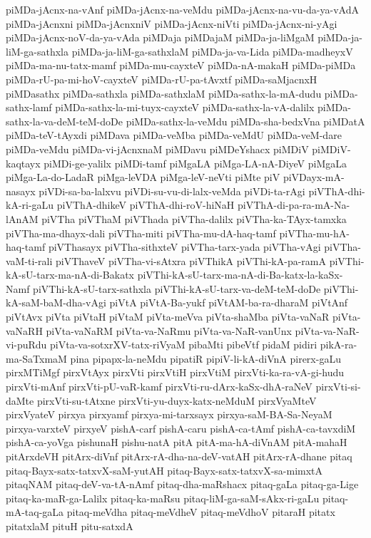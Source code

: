 {piMDa-jAcnx-na-vAnf
piMDa-jAcnx-na-veMdu
piMDa-jAcnx-na-vu-da-ya-vAdA
piMDa-jAcnxni
piMDa-jAcnxniV
piMDa-jAcnx-niVti
piMDa-jAcnx-ni-yAgi
piMDa-jAcnx-noV-da-ya-vAda
piMDaja
piMDajaM
piMDa-ja-liMgaM
piMDa-ja-liM-ga-sathxla
piMDa-ja-liM-ga-sathxlaM
piMDa-ja-va-Lida
piMDa-madheyxV
piMDa-ma-nu-tatx-mamf
piMDa-mu-cayxteV
piMDa-nA-makaH
piMDa-piMDa
piMDa-rU-pa-mi-hoV-cayxteV
piMDa-rU-pa-tAvxtf
piMDa-saMjacnxH
piMDasathx
piMDa-sathxla
piMDa-sathxlaM
piMDa-sathx-la-mA-dudu
piMDa-sathx-lamf
piMDa-sathx-la-mi-tuyx-cayxteV
piMDa-sathx-la-vA-dalilx
piMDa-sathx-la-va-deM-teM-doDe
piMDa-sathx-la-veMdu
piMDa-sha-bedxVna
piMDatA
piMDa-teV-tAyxdi
piMDava
piMDa-veMba
piMDa-veMdU
piMDa-veM-dare
piMDa-veMdu
piMDa-vi-jAcnxnaM
piMDavu
piMDeYshacx
piMDiV
piMDiV-kaqtayx
piMDi-ge-yalilx
piMDi-tamf
piMgaLA
piMga-LA-nA-DiyeV
piMgaLa
piMga-La-do-LadaR
piMga-leVDA
piMga-leV-neVti
piMte
piV
piVDayx-mA-nasayx
piVDi-sa-ba-lalxvu
piVDi-su-vu-di-lalx-veMda
piVDi-ta-rAgi
piVThA-dhi-kA-ri-gaLu
piVThA-dhikeV
piVThA-dhi-roV-hiNaH
piVThA-di-pa-ra-mA-Na-lAnAM
piVTha
piVThaM
piVThada
piVTha-dalilx
piVTha-ka-TAyx-tamxka
piVTha-ma-dhayx-dali
piVTha-miti
piVTha-mu-dA-haq-tamf
piVTha-mu-hA-haq-tamf
piVThasayx
piVTha-sithxteV
piVTha-tarx-yada
piVTha-vAgi
piVTha-vaM-ti-rali
piVThaveV
piVTha-vi-sAtxra
piVThikA
piVThi-kA-pa-ramA
piVThi-kA-sU-tarx-ma-nA-di-Bakatx
piVThi-kA-sU-tarx-ma-nA-di-Ba-katx-la-kaSx-Namf
piVThi-kA-sU-tarx-sathxla
piVThi-kA-sU-tarx-va-deM-teM-doDe
piVThi-kA-saM-baM-dha-vAgi
piVtA
piVtA-Ba-yukf
piVtAM-ba-ra-dharaM
piVtAnf
piVtAvx
piVta
piVtaH
piVtaM
piVta-meVva
piVta-shaMba
piVta-vaNaR
piVta-vaNaRH
piVta-vaNaRM
piVta-va-NaRmu
piVta-va-NaR-vanUnx
piVta-va-NaR-vi-puRdu
piVta-va-sotxrXV-tatx-riVyaM
pibaMti
pibeVtf
pidaM
pidiri
pikA-ra-ma-SaTxmaM
pina
pipapx-la-neMdu
pipatiR
pipiV-li-kA-diVnA
pirerx-gaLu
pirxMTiMgf
pirxVtAyx
pirxVti
pirxVtiH
pirxVtiM
pirxVti-ka-ra-vA-gi-hudu
pirxVti-mAnf
pirxVti-pU-vaR-kamf
pirxVti-ru-dArx-kaSx-dhA-raNeV
pirxVti-si-daMte
pirxVti-su-tAtxne
pirxVti-yu-duyx-katx-neMduM
pirxVyaMteV
pirxVyateV
pirxya
pirxyamf
pirxya-mi-tarxsayx
pirxya-saM-BA-Sa-NeyaM
pirxya-varxteV
pirxyeV
pishA-carf
pishA-caru
pishA-ca-tAmf
pishA-ca-tavxdiM
pishA-ca-yoVga
pishunaH
pishu-natA
pitA
pitA-ma-hA-diVnAM
pitA-mahaH
pitArxdeVH
pitArx-diVnf
pitArx-rA-dha-na-deV-vatAH
pitArx-rA-dhane
pitaq
pitaq-Bayx-satx-tatxvX-saM-yutAH
pitaq-Bayx-satx-tatxvX-sa-mimxtA
pitaqNAM
pitaq-deV-va-tA-nAmf
pitaq-dha-maRshacx
pitaq-gaLa
pitaq-ga-Lige
pitaq-ka-maR-ga-Lalilx
pitaq-ka-maRsu
pitaq-liM-ga-saM-sAkx-ri-gaLu
pitaq-mA-taq-gaLa
pitaq-meVdha
pitaq-meVdheV
pitaq-meVdhoV
pitaraH
pitatx
pitatxlaM
pituH
pitu-satxdA
}
